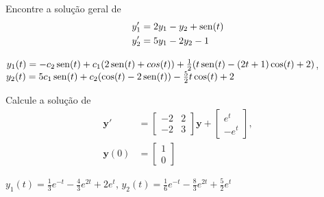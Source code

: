 \begin{exer}
  Encontre a solução geral de
  \begin{align}
    y_1' &= 2y_1 - y_2 + \operatorname{sen}(t)\\
    y_2' &= 5y_1 - 2y_2 - 1
  \end{align}
\end{exer}
\begin{resp}
  $y_{1}(t) = -c_2 \operatorname{sen}(t) + c_1 (2 \operatorname{sen}(t) + cos(t)) + \frac{1}{2}(t \operatorname{sen}(t) - (2 t + 1) \cos(t) + 2)$, $y_2(t) = 5 c_1 \operatorname{sen}(t) + c_2 (\cos(t) - 2 \operatorname{sen}(t)) - \frac{5}{2} t \cos(t) + 2$
\end{resp}

\begin{exer}
  Calcule a solução de
  \begin{align}
    \pmb{y}' &=
    \begin{bmatrix}
      -2 & 2 \\
      -2 & 3
    \end{bmatrix}\pmb{y} +
    \begin{bmatrix}
      e^{t} \\ -e^{t}
    \end{bmatrix}, \\
    \pmb{y}(0) &=
    \begin{bmatrix}
      1\\
      0
    \end{bmatrix}
  \end{align}
\end{exer}
\begin{resp}
  $y_{1}(t) = \frac{1}{3}e^{-t} - \frac{4}{3}e^{2t} + 2 e^t$, $y_{2}(t) = \frac{1}{6}e^{-t} - \frac{8}{3}e^{2t} + \frac{5}{2} e^t$
\end{resp}
